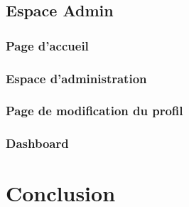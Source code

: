 \documentclass{article}
\begin{document}
        \subsection{Espace Admin}
            \subsubsection{Page d'accueil}
            \subsubsection{Espace d'administration}
            \subsubsection{Page de modification du profil}
            \subsubsection{Dashboard}
    \section{Conclusion}
        
\end{document}
